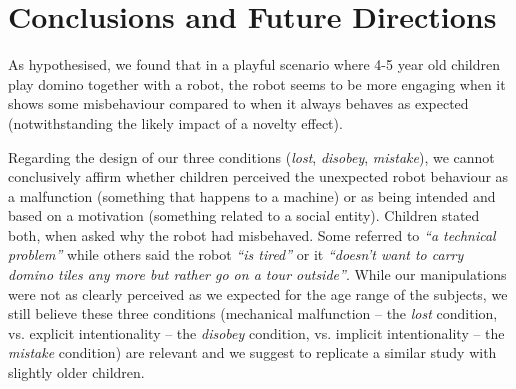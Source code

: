 \documentclass{sig-alternate}
\begin{document}
\section{Conclusions and Future Directions}


As hypothesised, we found that in a playful scenario where 4-5 year old children
play domino together with a robot, the robot seems to be more engaging when it
shows some misbehaviour compared to when it always behaves as expected
(notwithstanding the likely impact of a novelty effect).

Regarding the design of our three conditions (\emph{lost},
\emph{disobey}, \emph{mistake}), we cannot conclusively affirm whether children perceived the
unexpected robot behaviour as a malfunction (something that happens to a
machine) or as being intended and based on a motivation (something related to a
social entity). Children stated both, when asked why the robot had misbehaved.
Some referred to \textit{``a technical problem''} while others said the robot
\textit{``is tired''} or it \textit{``doesn't want to carry domino tiles any
more but rather go on a tour outside''}. While our manipulations were not as
clearly perceived as we expected for the age range of the subjects, we still
believe these three conditions (mechanical malfunction -- the \emph{lost}
condition, vs. explicit intentionality -- the \emph{disobey} condition, vs.
implicit intentionality -- the \emph{mistake} condition) are relevant and we
suggest to replicate a similar study with slightly older children.


\end{document}
